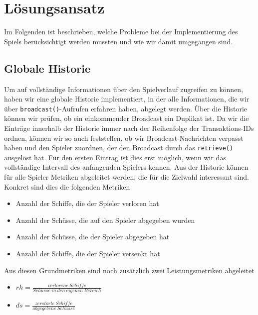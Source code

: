 
\section{Lösungsansatz}
Im Folgenden ist beschrieben, welche Probleme bei der Implementierung des Spiels berücksichtigt werden mussten und wie wir damit umgegangen sind.\\

\subsection{Globale Historie}
Um auf vollständige Informationen über den Spielverlauf zugreifen zu können, haben wir eine globale Historie implementiert, in der alle Informationen, die wir über \texttt{broadcast()}-Aufrufen erfahren haben, abgelegt werden. Über die Historie können wir prüfen, ob ein einkommender Broadcast ein Duplikat ist. Da wir die Einträge innerhalb der Historie immer nach der Reihenfolge der Transaktions-IDs ordnen, können wir so auch feststellen, ob wir Broadcast-Nachrichten verpasst haben und den Spieler zuordnen, der den Broadcast durch das \texttt{retrieve()} ausgelöst hat. Für den ersten Eintrag ist dies erst möglich, wenn wir das vollständige Intervall des anfangenden Spielers kennen. Aus der Historie können für alle Spieler Metriken abgeleitet werden, die für die Zielwahl interessant sind.\\

Konkret sind dies die folgenden Metriken
\begin{itemize}
	\item Anzahl der Schiffe, die der Spieler verloren hat
	\item Anzahl der Schüsse, die auf den Spieler abgegeben wurden
	\item Anzahl der Schüsse, die der Spieler abgegeben hat
	\item Anzahl der Schiffe, die der Spieler versenkt hat
\end{itemize}

Aus diesen Grundmetriken sind noch zusätzlich zwei Leistungsmetriken abgeleitet
\begin{itemize}
	\item $ rh = \frac{verlorene\:Schiffe}{Sch\ddot{u}sse\:in\:den\:eigenen\:Bereich} $
	\item $ ds = \frac{zerst\ddot{o}rte\:Schiffe}{abgegebene\:Sch\ddot{u}sse} $
\end{itemize}

